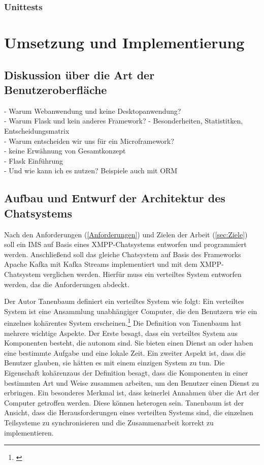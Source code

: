 \documentclass[a4paper,titlepage,halfparskip,12pt]{scrreprt}
\begin{document}
\begin{onehalfspacing}
\subsection{Unittests}
\label{Unittests}

\chapter{Umsetzung und Implementierung}
\label{chap:Umsetzung}

\section{Diskussion über die Art der Benutzeroberfläche}
\label{sec:DiskussionGUI}

- Warum Webanwendung und keine Desktopanwendung?\\
- Warum Flask und kein anderes Framework? - Besonderheiten, Statistitken, Entscheidungsmatrix\\
- Warum entscheiden wir uns für ein Microframework?\\
- keine Erwähnung von Gesamtkonzept\\
- Flask Einführung\\
- Und wie kann ich es nutzen? Beispiele auch mit ORM\\

\pagebreak

\section{Aufbau und Entwurf der Architektur des Chatsystems}
\label{sec:Architektur}

Nach den Anforderungen (\autoref{Anforderungen}) und Zielen der Arbeit (\autoref{sec:Ziele}) soll ein \ac{IMS} auf Basis eines \ac{XMPP}-Chatsystems entworfen und programmiert werden. Anschließend soll das gleiche Chatsystem auf Basis des Frameworks Apache Kafka mit Kafka Streams implementiert und mit dem \ac{XMPP}-Chatsystem verglichen werden. Hierfür muss ein verteiltes System entworfen werden, das die Anforderungen abdeckt.

Der Autor Tanenbaum definiert ein verteiltes System wie folgt: \glqq Ein verteiltes System ist eine Ansammlung unabhängiger Computer, die den Benutzern wie ein einzelnes kohärentes System erscheinen.\grqq \footnote{\cite[S.19]{andrew2008verteilte}} Die Definition von Tanenbaum hat mehrere wichtige Aspekte. Der Erste besagt, dass ein verteiltes System aus Komponenten besteht, die autonom sind. Sie bieten einen Dienst an oder haben eine bestimmte Aufgabe und eine lokale Zeit. Ein zweiter Aspekt ist, dass die Benutzer glauben, sie hätten es mit einem einzigen System zu tun. Die Eigenschaft \glqq kohärenz\grqq aus der Definition besagt, dass die Komponenten in einer bestimmten Art und Weise zusammen arbeiten, um den Benutzer einen Dienst zu erbringen. Ein besonderes Merkmal ist, dass keinerlei Annahmen über die Art der Computer getroffen werden. Diese können heterogen sein. Tanenbaum \cite{andrew2008verteilte} ist der Ansicht, dass die Herausforderungen eines verteilten Systems sind, die einzelnen Teilsysteme zu synchronisieren und die Zusammenarbeit korrekt zu implementieren.


\end{onehalfspacing}
\end{document}
